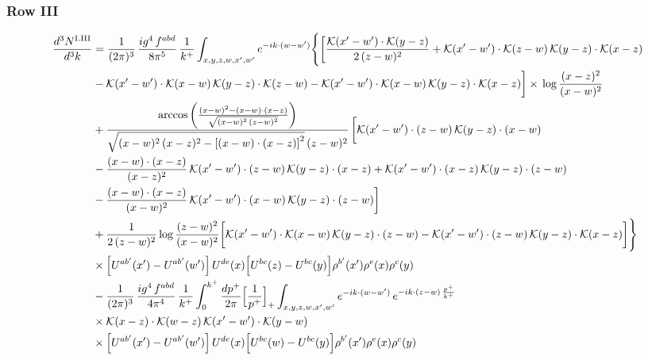 \documentclass[9pt]{article}
\numberwithin{equation}{section}
\begin{document}
\subsubsection*{Row III}
\begin{align}
\frac{d^{3}N^{\rm I.III}}{d^{3}k} &=\frac{1}{(2\pi)^{3}}\,\frac{ig^{4}\,f^{abd}}{8\pi^{5}}\,\frac{1}{k^{+}}\int_{x,y,z,w,x',w'}e^{-ik\cdot(w-w')}\Bigg\{\bigg[\frac{\mathcal{K}(x'-w')\cdot\mathcal{K}(y-z)}{2\,(z-w)^{2}}+\mathcal{K}(x'-w')\cdot\mathcal{K}(z-w)\,\mathcal{K}(y-z)\cdot\mathcal{K}(x-z)\notag \\
&-\mathcal{K}(x'-w')\cdot\mathcal{K}(x-w)\,\mathcal{K}(y-z)\cdot\mathcal{K}(z-w)-\mathcal{K}(x'-w')\cdot\mathcal{K}(x-w)\,\mathcal{K}(y-z)\cdot\mathcal{K}(x-z)\bigg]\times\, \log\frac{(x-z)^{2}}{(x-w)^{2}}\notag \\
&+\frac{\arccos\left(\frac{(x-w)^{2}-(x-w)\cdot (x-z)}{\sqrt{(x-w)^{2}\,(z-w)^{2}}}\right)}{\sqrt{(x-w)^{2}\,(x-z)^{2}-\left[(x-w)\cdot (x-z)\right]^{2}}\,(z-w)^{2}}\,\bigg[\mathcal{K}(x'-w')\cdot(z-w)\,\mathcal{K}(y-z)\cdot(x-w)\notag \\ & -\frac{(x-w)\cdot(x-z)}{(x-z)^{2}}\,\mathcal{K}(x'-w')\cdot(z-w)\,\mathcal{K}(y-z)\cdot(x-z)+\mathcal{K}(x'-w')\cdot(x-z)\,\mathcal{K}(y-z)\cdot(z-w)\notag \\ & -\frac{(x-w)\cdot(x-z)}{(x-w)^{2}}\,\mathcal{K}(x'-w')\cdot(x-w)\,\mathcal{K}(y-z)\cdot(z-w)\bigg]\notag \\
&+\frac{1}{2\,(z-w)^{2}}\log\frac{(z-w)^{2}}{(x-w)^{2}}\bigg[\mathcal{K}(x'-w')\cdot\mathcal{K}(x-w)\,\mathcal{K}(y-z)\cdot(z-w)-\mathcal{K}(x'-w')\cdot(z-w)\,\mathcal{K}(y-z)\cdot\mathcal{K}(x-z)\bigg]\Bigg\}\notag\\
&\times\Big[U^{ab'}(x')-U^{ab'}(w')\Big]\,U^{de}(x)\Big[U^{bc}(z)-U^{bc}(y)\Big]\rho^{b'}(x')\rho^{e}(x)\rho^{c}(y)\notag\\ &-\frac{1}{(2\pi)^{3}}\,\frac{ig^{4}\,f^{abd}}{4\pi^{4}}\,\frac{1}{k^{+}}\int_{0}^{k^{+}}\frac{dp^{+}}{2\pi}\Big[\frac{1}{p^{+}}\Big]_{+}\int_{x,y,z,w,x',w'}e^{-ik\cdot(w-w')}\,e^{-ik\cdot(z-w)\,\frac{p^{+}}{k^{+}}}\notag\\
&\times\mathcal{K}(x-z)\cdot\mathcal{K}(w-z)\,\mathcal{K}(x'-w')\cdot\mathcal{K}(y-w)\notag\\
&\times\Big[U^{ab'}(x')-U^{ab'}(w')\Big]\,U^{de}(x)\Big[U^{bc}(w)-U^{bc}(y)\Big]\rho^{b'}(x')\rho^{e}(x)\rho^{c}(y)\label{eq:B-I3}
\end{align}
\end{document}
